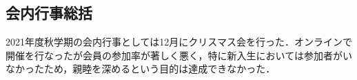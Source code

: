 \subsection*{会内行事総括}

2021年度秋学期の会内行事としては12月にクリスマス会を行った．オンラインで開催を行なったが会員の参加率が著しく悪く，特に新入生においては参加者がいなかったため，親睦を深めるという目的は達成できなかった．
